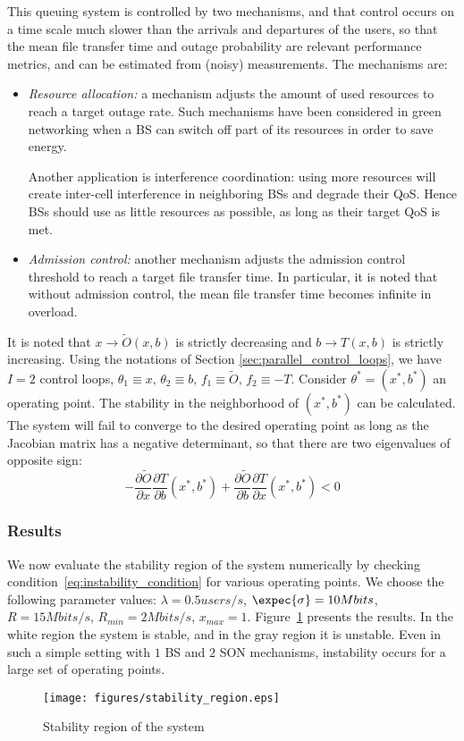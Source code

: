 \documentclass[10pt,conference,letterpaper]{IEEEtran}
\begin{document}
 This queuing system is controlled by two mechanisms, and that control occurs on a time scale much slower than the arrivals and departures of the users, so that the mean file transfer time and outage probability are relevant performance metrics, and can be estimated from (noisy) measurements. The mechanisms are:
\begin{itemize}
	\item \emph{Resource allocation:} a mechanism adjusts the amount of used resources to reach a target outage rate. Such mechanisms have been considered in green networking when a \ac{BS} can switch off part of its resources in order to save energy. 
		
	Another application is interference coordination: using more resources will create inter-cell interference in neighboring \acp{BS} and degrade their \ac{QoS}. Hence \acp{BS} should use as little resources as possible, as long as their target \ac{QoS} is met.
	\item \emph{Admission control: } another mechanism adjusts the admission control threshold to reach a target file transfer time. In particular, it is noted that without admission control, the mean file transfer time becomes infinite in overload.
\end{itemize}
It is noted that $x \to \tilde{O}(x,b)$ is strictly decreasing and \newline $b \to T(x,b)$ is strictly increasing. Using the notations of Section \ref{sec:parallel_control_loops}, we have $I = 2$ control loops, $\theta_1 \equiv x$, $\theta_2 \equiv b$, $f_1 \equiv \tilde{O}$, $f_2 \equiv -T$. Consider $\theta^* = (x^*,b^*)$ an operating point. The stability in the neighborhood of $(x^*,b^*)$ can be calculated. The system will fail to converge to the desired operating point as long as the Jacobian matrix has a negative determinant, so that there are two eigenvalues of opposite sign:
	\begin{equation}
		-\frac{\partial \tilde{O} }{\partial x} \frac{\partial T}{\partial b}(x^*,b^*) +  \frac{\partial \tilde{O} }{\partial b } \frac{\partial T}{\partial x}(x^*,b^*) < 0
		\label{eq:instability_condition}
	\end{equation}
\subsubsection{Results}
	We now evaluate the stability region of the system numerically by checking condition~\eqref{eq:instability_condition} for various operating points. We choose the following parameter values: $\lambda = 0.5 users/s$, $\expec{\sigma} = 10 Mbits$, $R = 15 Mbits/s$, $R_{min} = 2 Mbits/s$, $x_{max} = 1$. Figure~\ref{fig:stability_region} presents the results. In the white region the system is stable, and in the gray region it is unstable. Even in such a simple setting with $1$ \ac{BS} and $2$ \ac{SON} mechanisms, instability occurs for a large set of operating points.
	\begin{figure}[htbp]
		\begin{center}
			\texttt{[image: figures/stability\_region.eps]}
		\end{center}
		\caption{Stability region of the system}
		\label{fig:stability_region}
	\end{figure}
\end{document}
